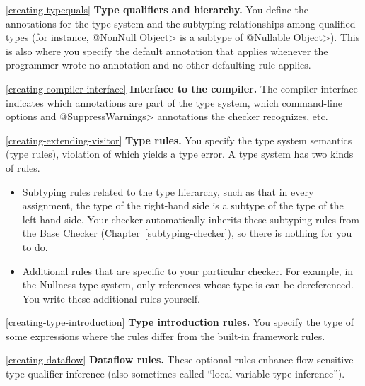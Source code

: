 \begin{description}

\item{\ref{creating-typequals}}
  \textbf{Type qualifiers and hierarchy.}  You define the annotations for
  the type system and the subtyping relationships among qualified types
  (for instance, \<@NonNull Object> is a subtype of \<@Nullable
  Object>).  This is also where you specify the default annotation that
  applies whenever the programmer wrote no annotation and no other defaulting
  rule applies.

\item{\ref{creating-compiler-interface}}
  \textbf{Interface to the compiler.}  The compiler interface indicates
  which annotations are part of the type system, which command-line options
  and \<@SuppressWarnings> annotations the checker recognizes, etc.

\item{\ref{creating-extending-visitor}}
  \textbf{Type rules.}  You specify the type system semantics (type
  rules), violation of which yields a type error.  A type system has two kinds of
  rules.
\begin{itemize}
\item
  Subtyping rules related to the type hierarchy, such as that in every
  assignment,
  the type of the right-hand side is a subtype of the type of the left-hand side.
  Your checker automatically inherits these subtyping rules from the Base
  Checker (Chapter~\ref{subtyping-checker}), so there is nothing for you to do.
\item
  Additional rules that are specific to your particular checker.  For
  example, in the Nullness type system, only references whose type is
   can be dereferenced.  You
  write these additional rules yourself.
\end{itemize}

\item{\ref{creating-type-introduction}}
  \textbf{Type introduction rules.}  You specify the type of some expressions where
  the rules differ from the built-in framework rules.

\item{\ref{creating-dataflow}}
  \textbf{Dataflow rules.}  These optional rules enhance flow-sensitive
  type qualifier inference (also sometimes called ``local variable type inference'').
\end{description}




